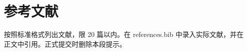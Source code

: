 ﻿\chapter{参考文献}
按照标准格式列出文献，限 20 篇以内。在 references.bib 中录入实际文献，并在正文中引用。正式提交时删除本段提示。
\printbibliography[heading=none]
